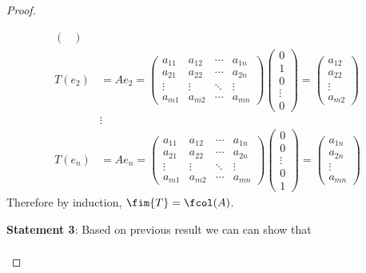 \begin{proof}
\begin{flushleft}
\begin{align*}
\begin{pmatrix}
			\end{pmatrix} \\
			T(e_2) & =Ae_2=\begin{pmatrix}
				a_{11} & a_{12} & \cdots & a_{1n} \\
				a_{21} & a_{22} & \cdots & a_{2n} \\
				\vdots & \vdots & \ddots & \vdots \\
				a_{m1} & a_{m2} & \cdots & a_{mn}
			\end{pmatrix}\begin{pmatrix}
				0 \\ 1 \\ 0 \\ \vdots \\ 0
			\end{pmatrix}=\begin{pmatrix}
				a_{12} \\ a_{22} \\ \vdots \\ a_{m2}
			\end{pmatrix} \\
			       & \vdots                                                                                   \\
			T(e_n) & =Ae_n=\begin{pmatrix}
				a_{11} & a_{12} & \cdots & a_{1n} \\
				a_{21} & a_{22} & \cdots & a_{2n} \\
				\vdots & \vdots & \ddots & \vdots \\
				a_{m1} & a_{m2} & \cdots & a_{mn}
			\end{pmatrix}\begin{pmatrix}
				0 \\ 0 \\ \vdots \\ 0 \\ 1
			\end{pmatrix}=\begin{pmatrix}
				a_{1n} \\ a_{2n} \\ \vdots \\ a_{mn}
			\end{pmatrix}
		\end{align*}
		Therefore by induction, $\fim{T}=\fcol(A)$.
	\end{flushleft}
	\begin{flushleft}
		\textbf{Statement 3}: Based on previous result we can can show that
		\begin{align*}

\end{align*}
\end{flushleft}
\end{proof}
